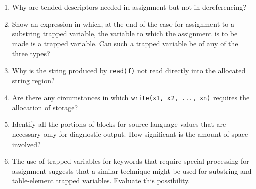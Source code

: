 \begin{enumerate}
\begin{enumerate}
\item 
Why are tended descriptors needed in assignment but not in dereferencing?

\item Show an expression in which, at the end of the case for
assignment to a substring trapped variable, the variable to which the
assignment is to be made is a trapped variable. Can such a trapped
variable be of any of the three types?

\item Why is the string produced by \texttt{read(f)} not read directly
into the allocated string region?

\item Are there any circumstances in which \texttt{write(x1, x2, ...,
xn)} requires the allocation of storage?

\item Identify all the portions of blocks for source-language values
that are necessary only for diagnostic output. How significant is the
amount of space involved?

\item The use of trapped variables for keywords that require special
processing for assignment suggests that a similar technique might be
used for substring and table-element trapped variables. Evaluate this
possibility.

\end{enumerate}
\end{enumerate}
\clearpage
\bigskip
